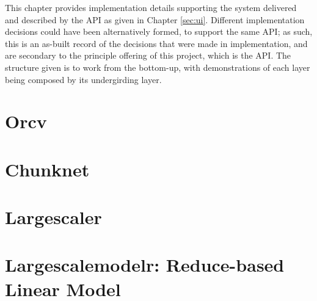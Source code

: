 This chapter provides implementation details supporting the system delivered and described by the API as given in Chapter \cref{sec:ui}.
Different implementation decisions could have been alternatively formed, to support the same API; as such, this is an as-built record of the decisions that were made in implementation, and are secondary to the principle offering of this project, which is the API.
The structure given is to work from the bottom-up, with demonstrations of each layer being composed by its undergirding layer.

\section{Orcv}

\section{Chunknet}

\section{Largescaler}

\section{Largescalemodelr: Reduce-based Linear Model}

